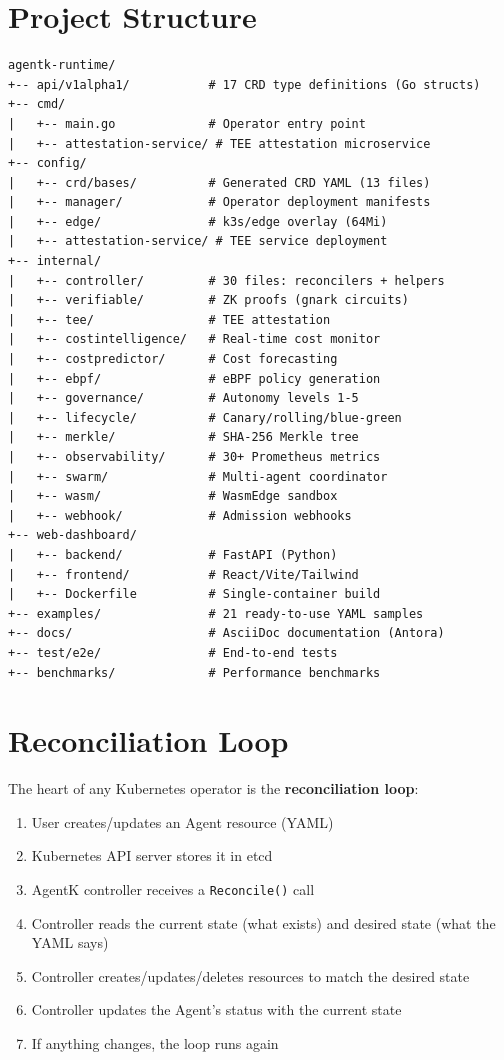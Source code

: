 \documentclass[12pt,a4paper,openany]{report}
\begin{document}
\section{Project Structure}

\begin{lstlisting}[style=bash, caption={Project directory tree}]
agentk-runtime/
+-- api/v1alpha1/           # 17 CRD type definitions (Go structs)
+-- cmd/
|   +-- main.go             # Operator entry point
|   +-- attestation-service/ # TEE attestation microservice
+-- config/
|   +-- crd/bases/          # Generated CRD YAML (13 files)
|   +-- manager/            # Operator deployment manifests
|   +-- edge/               # k3s/edge overlay (64Mi)
|   +-- attestation-service/ # TEE service deployment
+-- internal/
|   +-- controller/         # 30 files: reconcilers + helpers
|   +-- verifiable/         # ZK proofs (gnark circuits)
|   +-- tee/                # TEE attestation
|   +-- costintelligence/   # Real-time cost monitor
|   +-- costpredictor/      # Cost forecasting
|   +-- ebpf/               # eBPF policy generation
|   +-- governance/         # Autonomy levels 1-5
|   +-- lifecycle/          # Canary/rolling/blue-green
|   +-- merkle/             # SHA-256 Merkle tree
|   +-- observability/      # 30+ Prometheus metrics
|   +-- swarm/              # Multi-agent coordinator
|   +-- wasm/               # WasmEdge sandbox
|   +-- webhook/            # Admission webhooks
+-- web-dashboard/
|   +-- backend/            # FastAPI (Python)
|   +-- frontend/           # React/Vite/Tailwind
|   +-- Dockerfile          # Single-container build
+-- examples/               # 21 ready-to-use YAML samples
+-- docs/                   # AsciiDoc documentation (Antora)
+-- test/e2e/               # End-to-end tests
+-- benchmarks/             # Performance benchmarks
\end{lstlisting}

\section{Reconciliation Loop}

The heart of any Kubernetes operator is the \textbf{reconciliation loop}:

\begin{enumerate}
    \item User creates/updates an Agent resource (YAML)
    \item Kubernetes API server stores it in etcd
    \item AgentK controller receives a \texttt{Reconcile()} call
    \item Controller reads the current state (what exists) and desired state (what the YAML says)
    \item Controller creates/updates/deletes resources to match the desired state
    \item Controller updates the Agent's status with the current state
    \item If anything changes, the loop runs again
\end{enumerate}
\end{document}
